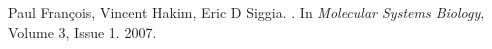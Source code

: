 \begin{frame}[c]



\tcitebullet Paul François, Vincent Hakim, Eric D Siggia. .
In \textit{Molecular Systems Biology}, Volume 3, Issue 1. 2007.

\end{frame}
